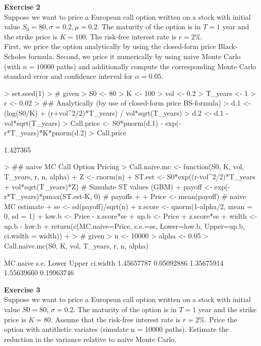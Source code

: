 \documentclass{article}
\begin{document}
\newpage
\textbf{Exercise 2} \\
Suppose we want to price a European call option written on a stock with initial value $S_0 = 80, \sigma = 0.2, \mu = 0.2$. The maturity of the option is in $T = 1$ year and the strike price is $K = 100$. The risk-free interest rate is $r = 2\%$.\\
First, we price the option analytically by using the closed-form price Black-Scholes formula. Second, we price it numerically by using naive Monte Carlo (with $n = 10000$ paths) and additionally compute the corresponding Monte Carlo standard error and confidence interval for $\alpha = 0.05$.
\begin{Schunk}
\begin{Sinput}
> set.seed(1)
> # given
> S0 <- 80
> K <- 100
> vol <- 0.2
> T_years <- 1
> r <- 0.02
> ## Analytically (by use of closed-form price BS-formula)
> d.1 <- (log(S0/K) + (r+vol^2/2)*T_years) / vol*sqrt(T_years)
> d.2 <- d.1 - vol*sqrt(T_years)
> Call.price <- S0*pnorm(d.1) - exp(-r*T_years)*K*pnorm(d.2)
> Call.price
\end{Sinput}
\begin{Soutput}
[1] 1.427365
\end{Soutput}
\begin{Sinput}
> ## naive MC Call Option Pricing
> Call.naive.mc <- function(S0, K, vol, T_years, r, n, alpha) {
+   Z <- rnorm(n)
+   ST.est <- S0*exp((r-vol^2/2)*T_years + vol*sqrt(T_years)*Z) # Simulate ST values (GBM)
+   payoff <- exp(-r*T_years)*pmax(ST.est-K, 0) # payoffs 
+   
+   Price <- mean(payoff)  # naive MC estimate
+   se <- sd(payoff)/sqrt(n)
+   z.score <- qnorm(1-alpha/2, mean = 0, sd = 1)
+   low.b <- Price - z.score*se
+   up.b <- Price + z.score*se
+   width <- up.b - low.b
+   return(c(MC.naive=Price, s.e.=se, Lower=low.b, Upper=up.b, ci.width = width))
+ }
> # given
> n <- 10000
> alpha <- 0.05
> Call.naive.mc(S0, K, vol, T_years, r, n, alpha)
\end{Sinput}
\begin{Soutput}
  MC.naive       s.e.      Lower      Upper   ci.width 
1.45657787 0.05092886 1.35675914 1.55639660 0.19963746 
\end{Soutput}
\end{Schunk}

\newpage
\textbf{Exercise 3} \\

Suppose we want to price a European call option written on a stock with initial value $S0 = 80$, $\sigma = 0.2$. The maturity of the option is in $T = 1$ year and the strike price is $K = 80$. Assume that the risk-free interest rate is $r = 2\%$. Price the option with antithetic variates (simulate n = 10000 paths). Estimate the reduction in
the variance relative to naive Monte Carlo.\\
\end{document}
